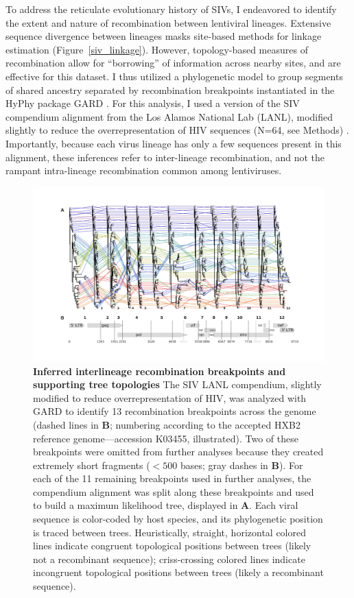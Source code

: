 To address the reticulate evolutionary history of SIVs, I endeavored to identify the extent and nature of recombination between lentiviral lineages.
Extensive sequence divergence between lineages masks site-based methods for linkage estimation (Figure~\ref{siv_linkage}).
However, topology-based measures of recombination allow for “borrowing” of information across nearby sites, and are effective for this dataset.
I thus utilized a phylogenetic model to group segments of shared ancestry separated by recombination breakpoints instantiated in the HyPhy package GARD \citep{kosakovsky2006gard}.
For this analysis, I used a version of the SIV compendium alignment from the Los Alamos National Lab (LANL), modified slightly to reduce the overrepresentation of HIV sequences (N=64, see Methods) \citep{los2012hiv}.
Importantly, because each virus lineage has only a few sequences present in this alignment, these inferences refer to inter-lineage recombination, and not the rampant intra-lineage recombination common among lentiviruses.

\begin{figure}[ht!]
  \begin{centering}
    \includegraphics[width=\linewidth]{./png/siv_recombination.png}
  	\caption[Inferred interlineage recombination breakpoints and supporting tree topologies]{\textbf{Inferred interlineage recombination breakpoints and supporting tree topologies }
The SIV LANL compendium, slightly modified to reduce overrepresentation of HIV, was analyzed with GARD to identify 13 recombination breakpoints across the genome (dashed lines in \textbf{B}; numbering according to the accepted HXB2 reference genome---accession K03455, illustrated).
Two of these breakpoints were omitted from further analyses because they created extremely short fragments ($<500$ bases; gray dashes in \textbf{B}).
For each of the 11 remaining breakpoints used in further analyses, the compendium alignment was split along these breakpoints and used to build a maximum likelihood tree, displayed in \textbf{A}.
Each viral sequence is color-coded by host species, and its phylogenetic position is traced between trees.
Heuristically, straight, horizontal colored lines indicate congruent topological positions between trees (likely not a recombinant sequence); criss-crossing colored lines indicate incongruent topological positions between trees (likely a recombinant sequence).
}
  	\label{siv_recombination}
  \end{centering}
\end{figure}

